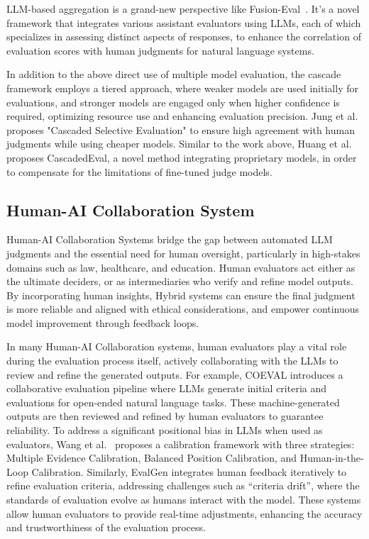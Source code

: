 LLM-based aggregation is a grand-new perspective like Fusion-Eval~\cite{shu2024fusion}. It's a novel framework that integrates various assistant evaluators using LLMs, each of which specializes in assessing distinct aspects of responses, to enhance the correlation of evaluation scores with human judgments for natural language systems.

In addition to the above direct use of multiple model evaluation, the cascade framework employs a tiered approach, where weaker models are used initially for evaluations, and stronger models are engaged only when higher confidence is required, optimizing resource use and enhancing evaluation precision.
Jung et al.~\cite{jung2024trust} proposes "Cascaded Selective Evaluation" to ensure high agreement with human judgments while using cheaper models.
Similar to the work above, Huang et al.~\cite{huang2024limitations} proposes CascadedEval, a novel method integrating proprietary models, in order to compensate for the limitations of fine-tuned judge models.

\subsection{Human-AI Collaboration System}
\label{sec:Hybrid System}


Human-AI Collaboration Systems bridge the gap between automated LLM judgments and the essential need for human oversight, particularly in high-stakes domains such as law, healthcare, and education. Human evaluators act either as the ultimate deciders, or as intermediaries who verify and refine model outputs. By incorporating human insights, Hybrid systems can ensure the final judgment is more reliable and aligned with ethical considerations, and empower continuous model improvement through feedback loops.

In many Human-AI Collaboration systems, human evaluators play a vital role during the evaluation process itself, actively collaborating with the LLMs to review and refine the generated outputs.
For example, COEVAL\cite{li2023collaborative} introduces a collaborative evaluation pipeline where LLMs generate initial criteria and evaluations for open-ended natural language tasks. These machine-generated outputs are then reviewed and refined by human evaluators to guarantee reliability.
To address a significant positional bias in LLMs when used as evaluators, Wang et al.~\cite{wang2023large} proposes a calibration framework with three strategies: Multiple Evidence Calibration, Balanced Position Calibration, and Human-in-the-Loop Calibration.
Similarly, EvalGen\cite{shankar2024validates} integrates human feedback iteratively to refine evaluation criteria, addressing challenges such as  ``criteria drift'', where the standards of evaluation evolve as humans interact with the model.
These systems allow human evaluators to provide real-time adjustments, enhancing the accuracy and trustworthiness of the evaluation process.

